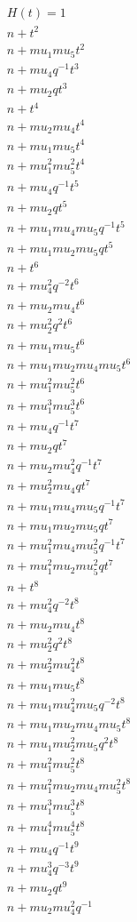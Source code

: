 \begin{align*}
H(t) = {}1 \\n  + t^{2} \\n  + mu_1 mu_5 t^{2} \\n  + mu_4 q^{-1} t^{3} \\n  + mu_2 q t^{3} \\n  + t^{4} \\n  + mu_2 mu_4 t^{4} \\n  + mu_1 mu_5 t^{4} \\n  + mu_1^{2} mu_5^{2} t^{4} \\n  + mu_4 q^{-1} t^{5} \\n  + mu_2 q t^{5} \\n  + mu_1 mu_4 mu_5 q^{-1} t^{5} \\n  + mu_1 mu_2 mu_5 q t^{5} \\n  + t^{6} \\n  + mu_4^{2} q^{-2} t^{6} \\n  + mu_2 mu_4 t^{6} \\n  + mu_2^{2} q^{2} t^{6} \\n  + mu_1 mu_5 t^{6} \\n  + mu_1 mu_2 mu_4 mu_5 t^{6} \\n  + mu_1^{2} mu_5^{2} t^{6} \\n  + mu_1^{3} mu_5^{3} t^{6} \\n  + mu_4 q^{-1} t^{7} \\n  + mu_2 q t^{7} \\n  + mu_2 mu_4^{2} q^{-1} t^{7} \\n  + mu_2^{2} mu_4 q t^{7} \\n  + mu_1 mu_4 mu_5 q^{-1} t^{7} \\n  + mu_1 mu_2 mu_5 q t^{7} \\n  + mu_1^{2} mu_4 mu_5^{2} q^{-1} t^{7} \\n  + mu_1^{2} mu_2 mu_5^{2} q t^{7} \\n  + t^{8} \\n  + mu_4^{2} q^{-2} t^{8} \\n  + mu_2 mu_4 t^{8} \\n  + mu_2^{2} q^{2} t^{8} \\n  + mu_2^{2} mu_4^{2} t^{8} \\n  + mu_1 mu_5 t^{8} \\n  + mu_1 mu_4^{2} mu_5 q^{-2} t^{8} \\n  + mu_1 mu_2 mu_4 mu_5 t^{8} \\n  + mu_1 mu_2^{2} mu_5 q^{2} t^{8} \\n  + mu_1^{2} mu_5^{2} t^{8} \\n  + mu_1^{2} mu_2 mu_4 mu_5^{2} t^{8} \\n  + mu_1^{3} mu_5^{3} t^{8} \\n  + mu_1^{4} mu_5^{4} t^{8} \\n  + mu_4 q^{-1} t^{9} \\n  + mu_4^{3} q^{-3} t^{9} \\n  + mu_2 q t^{9} \\n  + mu_2 mu_4^{2} q^{-1} 
\end{align*}
